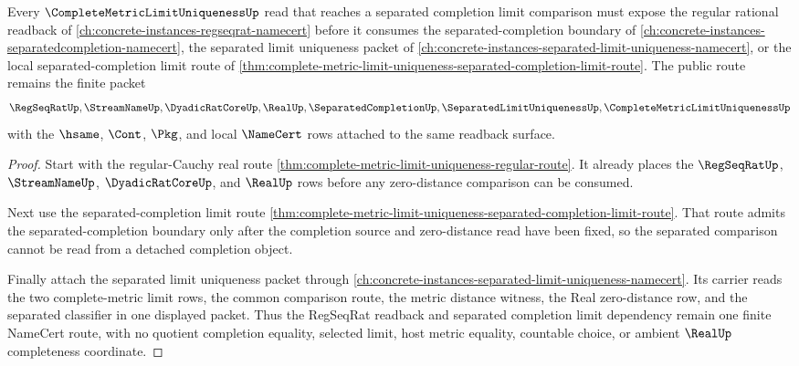 \begin{theorem}
\label{thm:complete-metric-limit-uniqueness-regseqrat-dependency}
Every $\CompleteMetricLimitUniquenessUp$ read that reaches a separated completion limit comparison must expose the regular rational readback of \autoref{ch:concrete-instances-regseqrat-namecert} before it consumes the separated-completion boundary of \autoref{ch:concrete-instances-separatedcompletion-namecert}, the separated limit uniqueness packet of \autoref{ch:concrete-instances-separated-limit-uniqueness-namecert}, or the local separated-completion limit route of \autoref{thm:complete-metric-limit-uniqueness-separated-completion-limit-route}. The public route remains the finite packet
$$
\RegSeqRatUp,\StreamNameUp,\DyadicRatCoreUp,\RealUp,\SeparatedCompletionUp,\SeparatedLimitUniquenessUp,\CompleteMetricLimitUniquenessUp
$$
with the $\hsame$, $\Cont$, $\Pkg$, and local $\NameCert$ rows attached to the same readback surface.
\end{theorem}
\begin{proof}
Start with the regular-Cauchy real route \autoref{thm:complete-metric-limit-uniqueness-regular-route}. It already places the $\RegSeqRatUp$, $\StreamNameUp$, $\DyadicRatCoreUp$, and $\RealUp$ rows before any zero-distance comparison can be consumed.

Next use the separated-completion limit route \autoref{thm:complete-metric-limit-uniqueness-separated-completion-limit-route}. That route admits the separated-completion boundary only after the completion source and zero-distance read have been fixed, so the separated comparison cannot be read from a detached completion object.

Finally attach the separated limit uniqueness packet through \autoref{ch:concrete-instances-separated-limit-uniqueness-namecert}. Its carrier reads the two complete-metric limit rows, the common comparison route, the metric distance witness, the Real zero-distance row, and the separated classifier in one displayed packet. Thus the RegSeqRat readback and separated completion limit dependency remain one finite NameCert route, with no quotient completion equality, selected limit, host metric equality, countable choice, or ambient $\RealUp$ completeness coordinate.
\end{proof}
